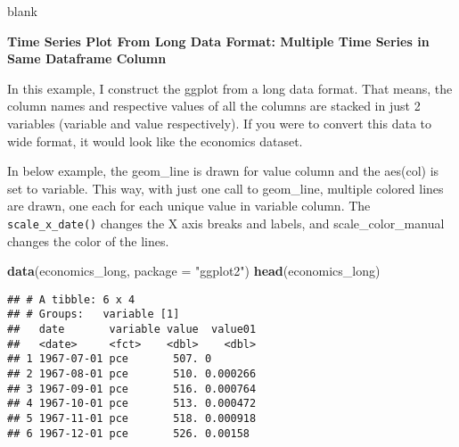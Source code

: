 \documentclass[a4paper]{article}
\newenvironment{Shaded}{\begin{snugshade}}{\end{snugshade}}
\newcommand{\KeywordTok}[1]{\textcolor[rgb]{0.13,0.29,0.53}{\textbf{#1}}}
\newcommand{\DataTypeTok}[1]{\textcolor[rgb]{0.13,0.29,0.53}{#1}}
\newcommand{\StringTok}[1]{\textcolor[rgb]{0.31,0.60,0.02}{#1}}
\newcommand{\NormalTok}[1]{#1}
\begin{document}
blank

\newpage

\textbf{Time Series Plot From Long Data Format: Multiple Time Series in
Same Dataframe Column}

In this example, I construct the ggplot from a long data format. That
means, the column names and respective values of all the columns are
stacked in just 2 variables (variable and value respectively). If you
were to convert this data to wide format, it would look like the
economics dataset.

In below example, the geom\_line is drawn for value column and the
aes(col) is set to variable. This way, with just one call to geom\_line,
multiple colored lines are drawn, one each for each unique value in
variable column. The \texttt{scale\_x\_date()} changes the X axis breaks
and labels, and scale\_color\_manual changes the color of the lines.

\begin{Shaded}
\begin{Highlighting}[]
\KeywordTok{data}\NormalTok{(economics_long, }\DataTypeTok{package =} \StringTok{"ggplot2"}\NormalTok{)}
\KeywordTok{head}\NormalTok{(economics_long)}
\end{Highlighting}
\end{Shaded}

\begin{verbatim}
## # A tibble: 6 x 4
## # Groups:   variable [1]
##   date       variable value  value01
##   <date>     <fct>    <dbl>    <dbl>
## 1 1967-07-01 pce       507. 0       
## 2 1967-08-01 pce       510. 0.000266
## 3 1967-09-01 pce       516. 0.000764
## 4 1967-10-01 pce       513. 0.000472
## 5 1967-11-01 pce       518. 0.000918
## 6 1967-12-01 pce       526. 0.00158
\end{verbatim}
\end{document}
